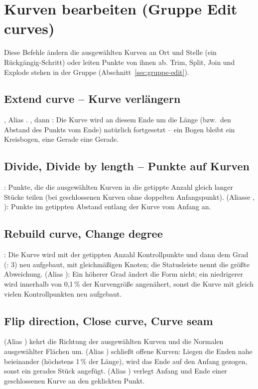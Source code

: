 \section{Kurven bearbeiten (Gruppe Edit curves)}\label{sec:gruppe-curve-edit}

Diese Befehle ändern die ausgewählten Kurven an Ort und Stelle (ein Rückgängig-Schritt) oder
leiten Punkte von ihnen ab. Trim, Split, Join und Explode stehen in der Gruppe 
(Abschnitt~\ref{sec:gruppe-edit}).

\subsection{Extend curve -- Kurve verlängern}\label{sec:cmd-extend}
, Alias . , dann
: Die Kurve wird an diesem Ende um die Länge (bzw.\ den
Abstand des Punkts vom Ende) natürlich fortgesetzt -- ein Bogen bleibt ein Kreisbogen, eine
Gerade eine Gerade.

\subsection{Divide, Divide by length -- Punkte auf Kurven}\label{sec:cmd-divide}
: Punkte, die die ausgewählten Kurven in die getippte Anzahl gleich langer Stücke
teilen (bei geschlossenen Kurven ohne doppelten Anfangspunkt).  (Aliasse
, ): Punkte im getippten Abstand entlang der Kurve vom Anfang
an.

\subsection{Rebuild curve, Change degree}\label{sec:cmd-rebuild}
: Die Kurve wird mit der getippten Anzahl Kontrollpunkte und dann dem Grad
(: 3) neu aufgebaut, mit gleichmäßigen Knoten; die Statusleiste nennt die größte
Abweichung.  (Alias ): Ein höherer Grad ändert die Form
nicht; ein niedrigerer wird innerhalb von 0,1\,\% der Kurvengröße angenähert, sonst die Kurve mit
gleich vielen Kontrollpunkten neu aufgebaut.

\subsection{Flip direction, Close curve, Curve seam}\label{sec:cmd-flip}
 (Alias ) kehrt die Richtung der ausgewählten Kurven und die Normalen
ausgewählter Flächen um.  (Alias ) schließt offene Kurven: Liegen die
Enden nahe beieinander (höchstens 1\,\% der Länge), wird das Ende auf den Anfang gezogen, sonst
ein gerades Stück angefügt.  (Alias ) verlegt Anfang und Ende einer
geschlossenen Kurve an den geklickten Punkt.

